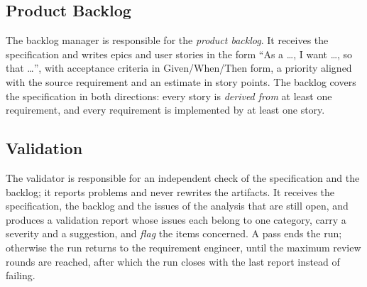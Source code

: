 \subsection{Product Backlog}
\label{sec:pa-backlog}

The backlog manager is responsible for the \emph{product backlog}. It receives the specification and writes epics and user stories in the form ``As a \ldots, I want \ldots, so that \ldots'', with acceptance criteria in Given/When/Then form, a priority aligned with the source requirement and an estimate in story points. The backlog covers the specification in both directions: every story is \emph{derived from} at least one requirement, and every requirement is implemented by at least one story.

\subsection{Validation}
\label{sec:pa-validation}

The validator is responsible for an independent check of the specification and the backlog; it reports problems and never rewrites the artifacts. It receives the specification, the backlog and the issues of the analysis that are still open, and produces a validation report whose issues each belong to one category, carry a severity and a suggestion, and \emph{flag} the items concerned. A pass ends the run; otherwise the run returns to the requirement engineer, until the maximum review rounds are reached, after which the run closes with the last report instead of failing.
